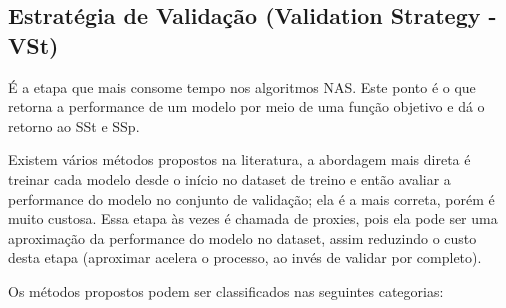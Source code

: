 \documentclass[a4paper,12pt]{article}
\begin{document}
\subsection{Estratégia de Validação (Validation Strategy - VSt)}

É a etapa que mais consome tempo nos algoritmos NAS. Este ponto é o que retorna a performance de um modelo por meio de uma função objetivo e dá o retorno ao SSt e SSp. 

Existem vários métodos propostos na literatura, a abordagem mais direta é treinar cada modelo desde o início no dataset de treino e então avaliar a performance do modelo no conjunto de validação; ela é a mais correta, porém é muito custosa. Essa etapa às vezes é chamada de proxies, pois ela pode ser uma aproximação da performance do modelo no dataset, assim reduzindo o custo desta etapa (aproximar acelera o processo, ao invés de validar por completo).

Os métodos propostos podem ser classificados nas seguintes categorias:
\end{document}

